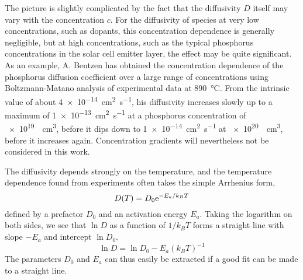 \documentclass[11pt,bibliography=totoc,index=totoc]{scrbook}   %
\begin{document}
The picture is slightly complicated by the fact that the diffusivity $D$ itself may vary with the concentration $c$.
For the diffusivity of species at very low concentrations, such as dopants, this concentration dependence is generally negligible, but at high concentrations, such as the typical phosphorus concentrations in the solar cell emitter layer, the effect may be quite significant.
As an example, A. Bentzen has obtained the concentration dependence of the phosphorus diffusion coefficient over a large range of concentrations using Boltzmann-Matano analysis of experimental data at \SI{890}{\celsius}. 
From the intrinsic value of about \SI{4e-14}{\centi\metre\squared\per\second}, his diffusivity increases slowly up to a maximum of \SI{1e-13}{\centi\metre\squared\per\second} at a phosphorus concentration of \SI{e19}{\per\centi\metre\cubed}, before it dips down to \SI{1e-14}{\centi\metre\squared\per\second} at \SI{e20}{\per\centi\metre\cubed}, before it increases again.\cite{Bentzen:2006} Concentration gradients will nevertheless not be considered in this work.

The diffusivity depends strongly on the temperature, and the temperature dependence found from experiments often takes the simple Arrhenius form,
\begin{equation}
  D(T) = D_0 \mathrm{e}^{-E_a/k_BT}
  \label{eq:arrhenius-dif}
\end{equation}
defined by a prefactor $D_0$ and an activation energy $E_a$. 
Taking the logarithm on both sides, we see that $\ln D$ as a function of $1/k_BT$ forms a straight line with slope $-E_a$ and intercept $\ln D_0$. 
\begin{equation}
  \ln D = \ln D_0 - E_a (k_BT)^{-1}
\end{equation}
The parameters $D_0$ and $E_a$ can thus easily be extracted if a good fit can be made to a straight line.


\end{document}
